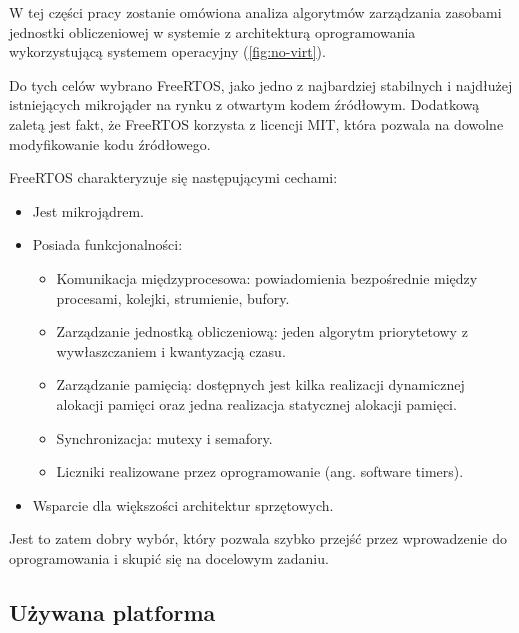 \documentclass[../../main]{subfiles}
\begin{document}
W tej części pracy zostanie omówiona analiza algorytmów zarządzania zasobami jednostki obliczeniowej w systemie z architekturą oprogramowania wykorzystującą systemem operacyjny (\cref{fig:no-virt}). 

Do tych celów wybrano FreeRTOS, jako jedno z najbardziej stabilnych i najdłużej istniejących mikrojąder na rynku z otwartym kodem źródłowym. Dodatkową zaletą jest fakt, że FreeRTOS korzysta z licencji MIT, która pozwala na dowolne modyfikowanie kodu źródłowego.

FreeRTOS charakteryzuje się następującymi cechami:

\begin{itemize}
    \item Jest mikrojądrem.
    \item Posiada funkcjonalności:
    \begin{itemize}
        \item Komunikacja międzyprocesowa: powiadomienia bezpośrednie między procesami, kolejki, strumienie, bufory.
        \item Zarządzanie jednostką obliczeniową: jeden algorytm priorytetowy z wywłaszczaniem i kwantyzacją czasu.
        \item Zarządzanie pamięcią: dostępnych jest kilka realizacji dynamicznej alokacji pamięci oraz jedna realizacja statycznej alokacji pamięci.
        \item Synchronizacja: mutexy i semafory.
        \item Liczniki realizowane przez oprogramowanie (ang. software timers).
    \end{itemize}
    \item Wsparcie dla większości architektur sprzętowych.
\end{itemize}

Jest to zatem dobry wybór, który pozwala szybko przejść przez wprowadzenie do oprogramowania i skupić się na docelowym zadaniu.

\subsection{Używana platforma}

%
%
\end{document}
